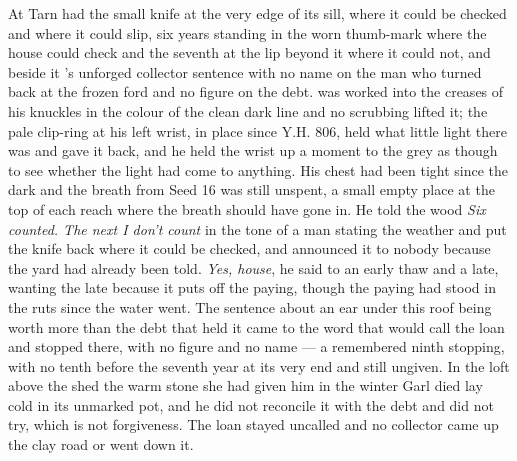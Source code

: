 At  Tarn had the small knife at the very edge of its sill, where it could be checked and where it could slip, six years standing in the worn thumb-mark where the house could check and the seventh at the lip beyond it where it could not, and beside it 's unforged collector sentence with no name on the man who turned back at the frozen ford and no figure on the debt.  was worked into the creases of his knuckles in the colour of the clean dark line and no scrubbing lifted it; the pale clip-ring at his left wrist, in place since Y.H. 806, held what little light there was and gave it back, and he held the wrist up a moment to the grey as though to see whether the light had come to anything. His chest had been tight since the dark and the breath from Seed 16 was still unspent, a small empty place at the top of each reach where the breath should have gone in. He told the wood \emph{Six counted. The next I don't count} in the tone of a man stating the weather and put the knife back where it could be checked, and announced it to nobody because the yard had already been told. \emph{Yes, house}, he said to an early thaw and a late, wanting the late because it puts off the paying, though the paying had stood in the ruts since the water went. The sentence about an ear under this roof being worth more than the debt that held it came to the word that would call the loan and stopped there, with no figure and no name --- a remembered ninth stopping, with no tenth before the seventh year at its very end and still ungiven. In the loft above the shed the warm stone she had given him in the winter Garl died lay cold in its unmarked pot, and he did not reconcile it with the debt and did not try, which is not forgiveness. The loan stayed uncalled and no collector came up the clay road or went down it.

